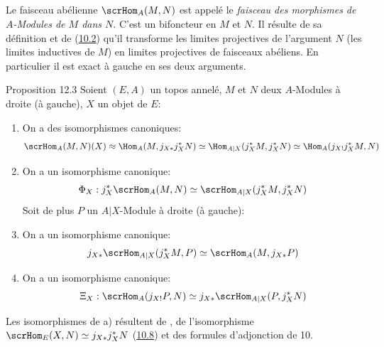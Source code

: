 \setcounter{subsection}{1}
\subsection{}
Le faisceau abélienne $\scrHom_A(M,N)$ est appelé le \emph{faisceau
des morphismes de $A$-Modules de $M$ dans $N$}. C'est un bifoncteur
en $M$ et $N$. Il résulte de sa définition et de
(\hyperref[IV.subsec10.2]{10.2}) qu'il transforme les limites projectives de
l'argument $N$ (\resp les limites inductives de $M$) en limites
projectives de faisceaux abéliens. En particulier il est exact à
gauche en ses deux arguments.

\begin{enonce*}{Proposition 12.3}
Soient $(E,A)$ un topos annelé, $M$ et $N$ deux $A$-Modules à droite
(\resp à gauche), $X$ un objet de $E$:
\begin{enumerate}
\renewcommand{\theenumi}{\alph{enumi}}
\renewcommand{\labelenumi}{\theenumi)}
\item On a des isomorphismes canoniques:
$$
\scrHom_A(M,N)(X)\approx \Hom_A(M, j_{X\ast}j^{\ast}_XN)\simeq
\Hom_{A| X}(j^{\ast}_XM, j^{\ast}_XN)\simeq
\Hom_A(j_{X!}j^{\ast}_XM, N)
$$

\item On a un isomorphisme canonique:
$$
\Phi_X:j^{\ast}_X\scrHom_A (M,N)\simeq \scrHom_{A| X}(j^{\ast}_X M,
j^{\ast}_XN)
$$
Soit de plus $P$ un $A| X$-Module à droite (\resp à gauche):

\item On a un isomorphisme canonique:
$$
j_{X\ast}\scrHom_{A| X}(j^{\ast}_X M,P)\simeq
\scrHom_A(M,j_{X\ast}P)
$$

\item On a un isomorphisme canonique:
$$
\Xi_X:\scrHom_A (j_{X!}P,N)\simeq j_{X\ast}\scrHom_{A|
X}(P,j^{\ast}_XN)
$$
\end{enumerate}
\end{enonce*}

\noindent Les isomorphismes de a) résultent de , de
l'isomorphisme $\scrHom_E(X,N)\simeq j_{X\ast}j^{\ast}_XN$
(\hyperref[IV.cor10.8]{10.8}) et des formules d'adjonction de 10.

